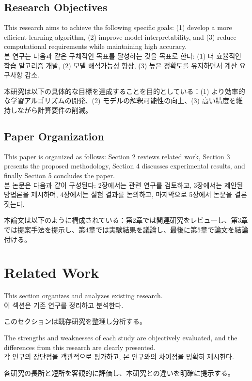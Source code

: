 \documentclass[12pt,a4paper]{article}
\begin{document}
\subsection{Research Objectives}
This research aims to achieve the following specific goals: (1) develop a more efficient learning algorithm, (2) improve model interpretability, and (3) reduce computational requirements while maintaining high accuracy. \\
본 연구는 다음과 같은 구체적인 목표를 달성하는 것을 목표로 한다: (1) 더 효율적인 학습 알고리즘 개발, (2) 모델 해석가능성 향상, (3) 높은 정확도를 유지하면서 계산 요구사항 감소. \\
\begin{CJK}{UTF8}{min}
本研究は以下の具体的な目標を達成することを目的としている：(1) より効率的な学習アルゴリズムの開発、(2) モデルの解釈可能性の向上、(3) 高い精度を維持しながら計算要件の削減。
\end{CJK}

\subsection{Paper Organization}
This paper is organized as follows: Section 2 reviews related work, Section 3 presents the proposed methodology, Section 4 discusses experimental results, and finally Section 5 concludes the paper. \\
본 논문은 다음과 같이 구성된다: 2장에서는 관련 연구를 검토하고, 3장에서는 제안된 방법론을 제시하며, 4장에서는 실험 결과를 논의하고, 마지막으로 5장에서 논문을 결론짓는다. \\
\begin{CJK}{UTF8}{min}
本論文は以下のように構成されている：第2章では関連研究をレビューし、第3章では提案手法を提示し、第4章では実験結果を議論し、最後に第5章で論文を結論付ける。
\end{CJK}

\section{Related Work}
\label{sec:related_work}

This section organizes and analyzes existing research. \\
이 섹션은 기존 연구를 정리하고 분석한다. \\
\begin{CJK}{UTF8}{min}
このセクションは既存研究を整理し分析する。
\end{CJK}

The strengths and weaknesses of each study are objectively evaluated, and the differences from this research are clearly presented. \\
각 연구의 장단점을 객관적으로 평가하고, 본 연구와의 차이점을 명확히 제시한다. \\
\begin{CJK}{UTF8}{min}
各研究の長所と短所を客観的に評価し、本研究との違いを明確に提示する。
\end{CJK}
\end{document}
